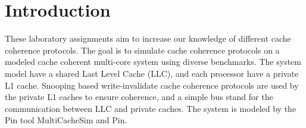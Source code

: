 \section{Introduction}
\label{sec:int}
These laboratory assignments aim to increase our knowledge of different cache coherence protocols. The goal is to simulate cache coherence protocols on a modeled cache coherent multi-core system using diverse benchmarks. The system model have a shared Last Level Cache (LLC), and each processor have a private L1 cache. Snooping based write-invalidate cache coherence protocols are used by the private L1 caches to ensure coherence, and a simple bus stand for the communication between LLC and private caches. The system is modeled by the Pin tool MultiCacheSim and Pin.